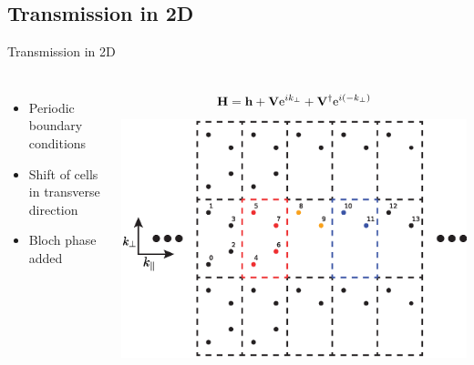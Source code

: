 \documentclass[hyperref={colorlinks=true,urlcolor=blue,linkcolor=.},aspectratio=1610,mathserif]{beamer}
\newcommand{\me}{\mathrm{e}}
\newcommand{\im}[3]{\inputminted[linenos=true, python3=true, firstline=#2, lastline=#3]{python}{#1}}
\begin{document}
\subsection{Transmission in 2D}

\begin{frame}{Transmission in 2D}
	\centering
	\begin{columns}[c]
		\begin{itemize}
		    \item Periodic boundary conditions
		    \item Shift of cells in transverse direction
		    \item Bloch phase added 
		\end{itemize}
		\begin{align*}
			\vb{H} = \vb{h} + \vb{V}\me^{ik_{\perp}} + \vb{V}^{\dagger} \me^{i\pqty{-k_{\perp}}}
		\end{align*}
		\includegraphics[width=.7\textwidth]{Figures/2DTrans.eps}
	\end{columns}
	\begin{columns}[c]
		\im{Listings/Functions.py}{250}{253}
	\end{columns}

\end{frame}
\end{document}
